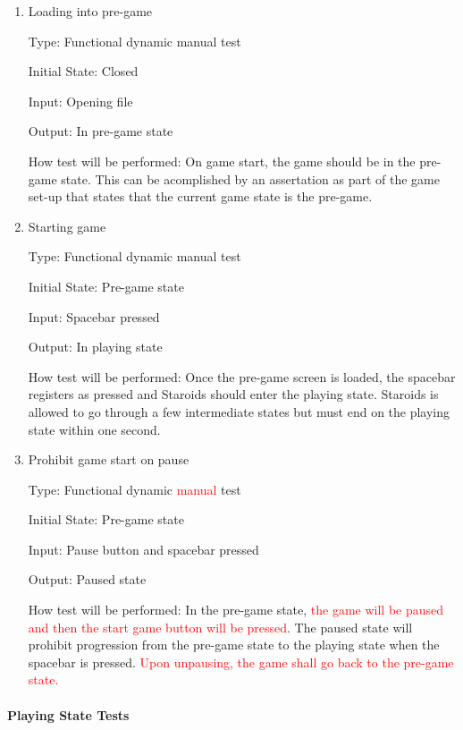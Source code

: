\documentclass[12pt, titlepage]{article}
\begin{document}
\begin{enumerate}

\item{Loading into pre-game\\}

Type: Functional dynamic manual test

Initial State: Closed

Input: Opening file

Output: In pre-game state

How test will be performed: On game start, the game should be in the pre-game state. This can be acomplished by an assertation as part of the game set-up that states that the current game state is the pre-game.

\item{Starting game\\}

Type: Functional dynamic manual test

Initial State: Pre-game state

Input: Spacebar pressed

Output: In playing state

How test will be performed: Once the pre-game screen is loaded, the spacebar registers as pressed and Staroids should enter the playing state. Staroids is allowed to go through a few intermediate states but must end on the playing state within one second.

\item{Prohibit game start on pause\\}

Type: Functional dynamic \textcolor{red}{manual} test

Initial State: Pre-game state

Input: Pause button and spacebar pressed

Output: Paused state

How test will be performed: In the pre-game state, \textcolor{red}{the game will be paused and then the start game button will be pressed}. The paused state will prohibit progression from the pre-game state to the playing state when the spacebar is pressed. \textcolor{red}{Upon unpausing, the game shall go back to the pre-game state.}

\end{enumerate}

\paragraph{Playing State Tests}
\end{document}
